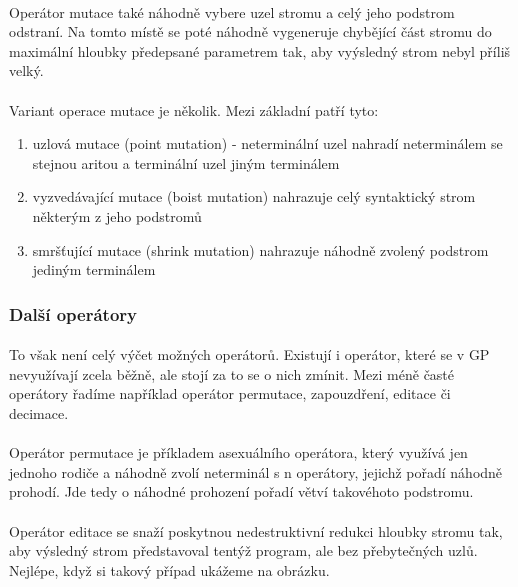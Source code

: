 \documentclass[bc,male,java,dept460]{diploma}		%
\begin{document}
\paragraph*{}
Operátor mutace také náhodně vybere uzel stromu a celý jeho podstrom odstraní. Na tomto místě se poté náhodně vygeneruje chybějící část stromu do maximální hloubky předepsané parametrem tak, aby vyýsledný strom nebyl příliš velký. 

\paragraph*{}
Variant operace mutace je několik. Mezi základní patří tyto:
\begin{enumerate}
\item uzlová mutace (point mutation) - neterminální uzel nahradí neterminálem se stejnou aritou a terminální uzel jiným terminálem
\item vyzvedávající mutace (boist mutation) nahrazuje celý syntaktický strom některým z jeho podstromů
\item smršťující mutace (shrink mutation) nahrazuje náhodně zvolený podstrom jediným terminálem
\end{enumerate}

\subsubsection{Další operátory}
\paragraph*{}
To však není celý výčet možných operátorů. Existují i operátor, které se v GP nevyužívají zcela běžně, ale stojí za to se o nich zmínit. Mezi méně časté operátory řadíme například operátor permutace, zapouzdření, editace či decimace.

\paragraph*{}
Operátor permutace je příkladem asexuálního operátora, který využívá jen jednoho rodiče a náhodně zvolí neterminál s n operátory, jejichž pořadí náhodně prohodí. Jde tedy o náhodné prohození pořadí větví takovéhoto podstromu.

\paragraph*{}
Operátor editace se snaží poskytnou nedestruktivní redukci hloubky stromu tak, aby výsledný strom představoval tentýž program, ale bez přebytečných uzlů. Nejlépe, když si takový případ ukážeme na obrázku.
\end{document}
